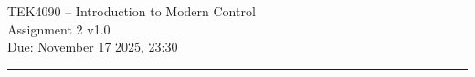 \documentclass[12pt,a4paper, onecolumn]{exam}
\begin{document}
\begingroup  
    \centering
    \LARGE TEK4090 -- Introduction to Modern Control\\
    \LARGE Assignment 2 v1.0\\[0.5em]
    \large Due: November 17 2025, 23:30\\
\endgroup
\rule{\textwidth}{0.4pt}


\renewcommand{\solutiontitle}{\noindent\textbf{Ans:}\enspace}   %
\renewenvironment{solution}
  {\begin{adjustwidth}{-2cm}{-2cm}%
   \par\noindent\solutiontitle\ignorespaces}
  {\end{adjustwidth}}
\end{document}
